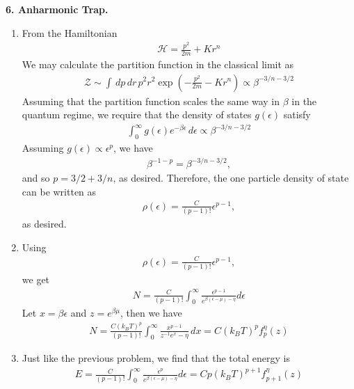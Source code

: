 \documentclass{article}
\theoremstyle{definition}
\newcommand{\ham}{\mathcal{H}}
\newcommand{\be}{\beta}
\newcommand{\f}[2]{\frac{#1}{#2}}
\newcommand{\lp}{\left(}
\newcommand{\rp}{\right)}
\begin{document}
\noindent \textbf{6. Anharmonic Trap.}

\begin{enumerate}[label=(\alph*)]
	\item From the Hamiltonian 
	\begin{align*}
	\ham = \f{p^2}{2m} + K r^n
	\end{align*}
	We may calculate the partition function in the classical limit as
	\begin{align*}
	\mathcal{Z} \sim \int \,dp\,dr\, p^2 r^2\exp\lp -\f{p^2}{2m} - Kr^n \rp \propto \be^{-3/n-3/2}
	\end{align*}
	Assuming that the partition function scales the same way in $\be$ in the quantum regime, we require that the density of states $g(\epsilon)$ satisfy
	\begin{align*}
	\int_0^\infty g(\epsilon) e^{-\be \epsilon}\,d\epsilon \propto \be^{-3/n-3/2}
	\end{align*}
	Assuming $g(\epsilon) \propto \epsilon^p$, we have
	\begin{align*}
	\be^{-1-p} = \be^{-3/n-3/2},
	\end{align*}
	and so $p = 3/2+3/n$, as desired. Therefore, the one particle density of state can be written as
	\begin{align*}
	\rho(\epsilon) = \f{C}{(p-1)!} \epsilon^{p-1},
	\end{align*}
	as desired. 
	
	
	
	\item Using 
	\begin{align*}
	\rho(\epsilon) = \f{C}{(p-1)!} \epsilon^{p-1},
	\end{align*}
	we get
	\begin{align*}
	N = \f{C}{(p-1)!} \int_0^\infty \f{\epsilon^{p-1}}{e^{\be(\epsilon-\mu) - \eta}} d\epsilon
	\end{align*}
	Let $x = \be \epsilon$ and $z = e^{\be\mu}$, then we have
	\begin{align*}
	N = \f{C (k_BT)^p}{ (p-1)!}\int_0^\infty \f{x^{p-1}}{z^{-1}e^x - \eta}\,dx = \boxed{C(k_BT)^p f_p^\eta(z)}
	\end{align*}
	
	\item Just like the previous problem, we find that the total energy is 
	\begin{align*}
	E = \f{C}{(p-1)!} \int_0^\infty \f{\epsilon^{p}}{e^{\be(\epsilon-\mu) - \eta}} d\epsilon = \boxed{C p (k_B T)^{p+1} f_{p+1}^\eta(z)}
	\end{align*}
	

\end{enumerate}
\end{document}
